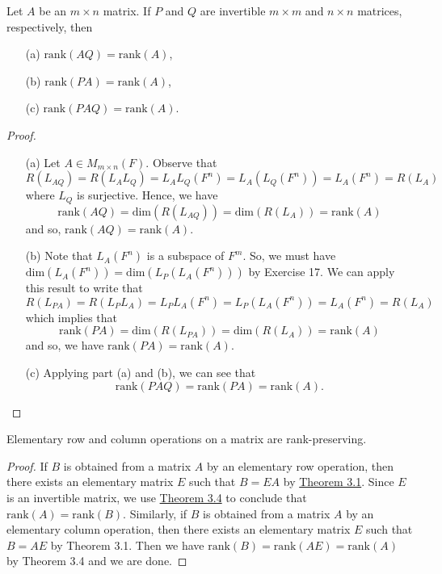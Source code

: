 \begin{theorem}\label{Theorem 3.4}
    Let \( A  \) be an \( m \times n  \) matrix. If \(  P  \) and \( Q  \) are invertible \( m \times m  \) and \( n \times n  \) matrices, respectively, then 
    \begin{enumerate}
        \item[(a)] \( \text{rank}(AQ) = \text{rank}(A) \),
        \item[(b)] \( \text{rank}(PA) = \text{rank}(A) \),
        \item[(c)] \( \text{rank}(PAQ) = \text{rank}(A) \).
    \end{enumerate}
\end{theorem}
\begin{proof}
    \begin{enumerate}
        \item[(a)] Let \( A \in {M}_{m \times n }(F) \). 
Observe that
\[  R({L}_{AQ}) = R({L}_{A} {L}_{Q}) = {L}_{A} {L}_{Q} (F^{n}) = {L}_{A} ({L}_{Q}(F^{n})) = {L}_{A}(F^{n}) = R({L}_{A}) \]
where \( {L}_{Q}  \) is surjective. Hence, we have 
\[  \text{rank}(AQ) = \text{dim}(R({L}_{AQ})) = \text{dim}(R({L}_{A})) = \text{rank}(A) \]
and so, \( \text{rank}(AQ) = \text{rank}(A) \). 
    \item[(b)] Note that \( {L}_{A}(F^{n})\) is a subspace of \( F^{m} \). So, we must have \( \text{dim}({L}_{A}(F^{n})) = \text{dim}({L}_{P}({L}_{A}(F^{n}))) \) by Exercise 17. We can apply this result to write that
        \[  R({L}_{PA}) = R({L}_{P}{L}_{A}) = {L}_{P}{L}_{A}(F^{n}) = {L}_{P}({L}_{A}(F^{n})) = {L}_{A}(F^{n}) = R({L}_{A})\]
        which implies that
        \[  \text{rank}(PA) = \text{dim}(R({L}_{PA})) = \text{dim}(R({L}_{A})) = \text{rank}(A) \]
        and so, we have \( \text{rank}(PA) = \text{rank}(A) \).
    \item[(c)] Applying part (a) and (b), we can see that
        \[  \text{rank}(PAQ) = \text{rank}(PA) = \text{rank}(A).  \]
    \end{enumerate}
\end{proof}

\begin{corollary}\label{Corollary to Theorem 3.4}
    Elementary row and column operations on a matrix are rank-preserving.
\end{corollary}
\begin{proof}
If \( B  \) is obtained from a matrix \( A  \) by an elementary row operation, then there exists an elementary matrix \( E  \) such that \( B = EA  \) by {\hyperref[Theorem 3.1]{Theorem 3.1}}. Since \( E  \) is an invertible matrix, we use {\hyperref[Theorem 3.4]{Theorem 3.4}} to conclude that \( \text{rank}(A) = \text{rank}(B) \). Similarly, if \(  B  \) is obtained from a matrix \( A  \) by an elementary column operation, then there exists an elementary matrix \( E  \) such that \( B = A E  \) by Theorem 3.1. Then we have \( \text{rank}(B) = \text{rank}(AE) = \text{rank}(A ) \) by Theorem 3.4 and we are done. 
\end{proof}

